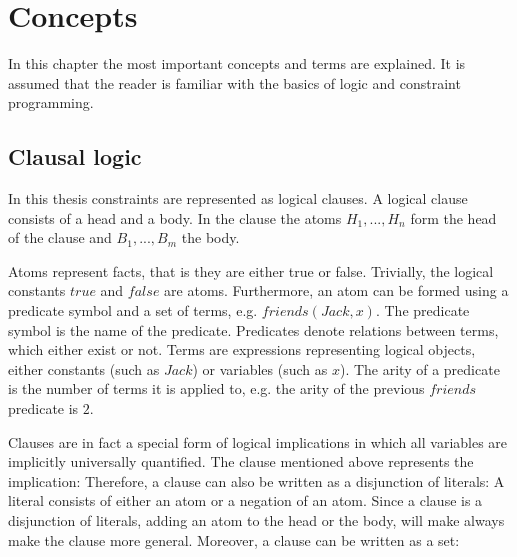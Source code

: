 \chapter{Concepts}
\label{cha:bg}

In this chapter the most important concepts and terms are explained. It is assumed that the reader is familiar with the basics of logic and constraint programming.

\section{Clausal logic}
\label{sec:clausal_logic}
In this thesis constraints are represented as logical clauses. A logical clause consists of a head and a body. In the clause the atoms $H_1, ..., H_n$ form the head of the clause and $B_1, ..., B_m$ the body. 

Atoms represent facts, that is they are either true or false. Trivially, the logical constants $true$ and $false$ are atoms. Furthermore, an atom can be formed using a predicate symbol and a set of terms, e.g. $friends(Jack, x)$. The predicate symbol is the name of the predicate. Predicates denote relations between terms, which either exist or not. Terms are expressions representing logical objects, either constants (such as $Jack$) or variables (such as $x$). The arity of a predicate is the number of terms it is applied to, e.g. the arity of the previous $friends$ predicate is $2$.

Clauses are in fact a special form of logical implications in which all variables are implicitly universally quantified. The clause mentioned above represents the implication:  Therefore, a clause can also be written as a disjunction of literals:  A literal consists of either an atom or a negation of an atom. Since a clause is a disjunction of literals, adding an atom to the head or the body, will make always make the clause more general. Moreover, a clause can be written as a set: 

